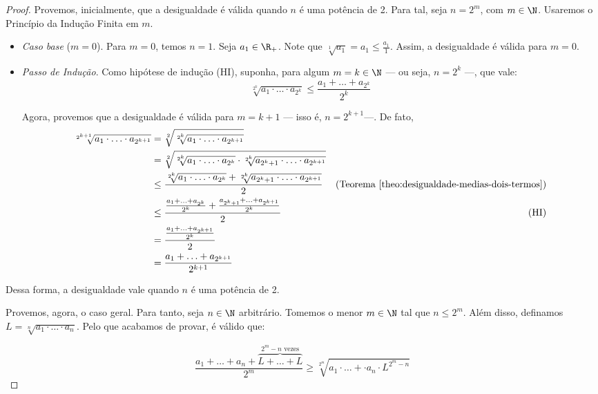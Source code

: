 \begin{proof}
	Provemos, inicialmente, que a desigualdade é válida quando $n$ é uma potência de 2.
	Para tal, seja $n = 2^m$, com $m \in \N$.
	Usaremos o Princípio da Indução Finita em $m$.

	\begin{itemize}
		\item \emph{Caso base} ($m=0$). Para $m=0$, temos $n=1$. 
		Seja $a_1 \in \R_+$. 
		Note que $\sqrt[1]{a_1}=a_1\le \frac{a_1}{1}$.
		Assim, a desigualdade é válida para $m=0$.

		\item \emph{Passo de Indução}. Como hipótese de indução (HI), suponha, para algum $m=k\in \N$ --- ou seja, $n=2^k$ ---, que vale:
		$$
		\sqrt[2^k]{a_1 \cdot \dots \cdot a_{2^k}}\le \frac{a_1 + \dots + a_{2^k}}{2^k}
		$$

		Agora, provemos que a desigualdade é válida para $m=k+1$ --- isso é, $n = 2^{k+1}$---. De fato,
		\begin{align*}
		\sqrt[2^{k+1}]{a_1 \cdot \ldots \cdot a_{2^{k+1}}} &= \sqrt[2]{\sqrt[2^k]{a_1 \cdot \ldots \cdot a_{2^{k+1}}}}&  \\
		& = \sqrt[2]{ \sqrt[2^k]{a_1 \cdot \ldots \cdot a_{2^k}} \cdot \sqrt[2^k]{a_{2^k+1} \cdot \ldots \cdot a_{2^{k+1}}}}& \\
		& \le \frac{\sqrt[2^k]{a_1 \cdot \ldots \cdot a_{2^k}} + \sqrt[2^k]{a_{2^k+1} \cdot \ldots \cdot a_{2^{k+1}}}  }{2} & \text{(Teorema \ref{theo:desigualdade-medias-dois-termos})}\\
		& \le \frac{ \frac{a_1 + \ldots + a_{2^k}}{2^k} + \frac{a_{2^k+1}+\ldots+a_{2^{k+1}}}{2^k}    }{2} & \text{(HI)}\\
		& = \frac{\frac{a_1 + \ldots + a_{2^{k+1}}}{2^k}}{2} & \\
		& = \frac{a_1 + \ldots + a_{2^{k+1}}}{2^{k+1}}  &
		\end{align*}
		
	\end{itemize}

	Dessa forma, a desigualdade vale quando $n$ é uma potência de 2.

	Provemos, agora, o caso geral.
	Para tanto, seja $n \in \N$ arbitrário.
	Tomemos o menor $m \in \N$ tal que $n \le 2^m$.
	Além disso, definamos $L = \sqrt[n]{a_1 \cdot \ldots \cdot a_n}$.
	Pelo que acabamos de provar, é válido que:

	$$
	\frac{a_1 + \ldots + a_n + \overbrace{L+\ldots + L}^{2^m - n \text{ vezes}}}{2^m} \ge \sqrt[2^m]{a_1 \cdot \ldots +\cdot a_n \cdot L^{2^m-n}}
	$$


\end{proof}
